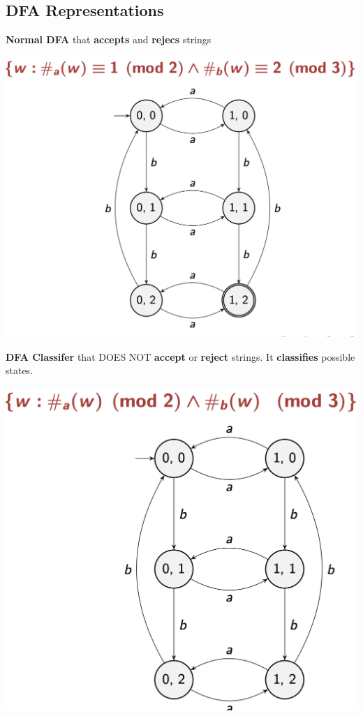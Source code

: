 \documentclass{article}
\begin{document}
  \subsection{DFA Representations}
  \textbf{Normal DFA} that \textbf{accepts} and \textbf{rejecs} strings
    \begin{center}
      \includegraphics[scale=0.4]{normalDFA}
    \end{center}
    \textbf{DFA Classifer} that DOES NOT \textbf{accept} or \textbf{reject} strings. It \textbf{classifies} possible states.
  \begin{center}
    \includegraphics[scale=0.4]{DFACLassifier}
  \end{center}
\end{document}
